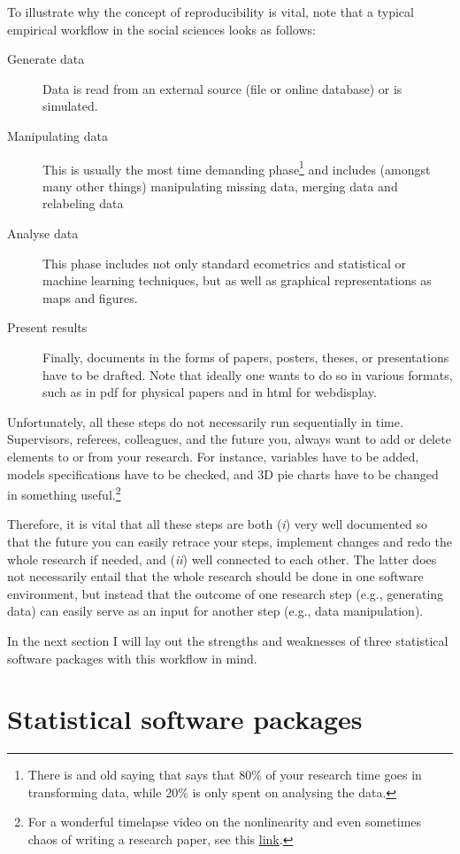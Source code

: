 \documentclass[fleqn,10pt]{SelfArx} %
\begin{document}
To illustrate why the concept of reproducibility is vital, note that a typical empirical workflow in the social sciences looks as follows:
\begin{description}
\item[Generate data] Data is read from an external source (file or online database) or is simulated.  
\item[Manipulating data] This is usually the most time demanding
  phase\footnote{There is and old saying that says that 80\% of your research time
  goes in transforming data, while 20\% is only spent on analysing the data.} and
  includes (amongst many other things) manipulating missing data, merging data
  and relabeling data
\item[Analyse data] This phase includes not only standard ecometrics and
  statistical or machine learning techniques, but as well as graphical
  representations as maps and figures. 
\item[Present results] Finally, documents in the forms of papers, posters, theses, or
  presentations have to be drafted. Note that ideally one wants to do so in various
  formats, such as in pdf for physical papers and in html for webdisplay. 
\end{description}
Unfortunately, all these steps do not necessarily run sequentially in time. Supervisors,
referees, colleagues, and the future you, always want to add or delete elements
to or from your research. For instance, variables have to be added,
models specifications have to be checked, and 3D pie charts have to be changed
in something useful.\footnote{For a wonderful timelapse video on the nonlinearity and even sometimes chaos of writing a research paper, see this \href{https://www.youtube.com/watch?v=hNENiG7LAnc}{link}.}

Therefore, it is vital that all these steps are both (\emph{i}) very well
documented so that the future you can easily retrace your steps, implement
changes and redo the whole research if needed, and (\emph{ii}) well connected to
each other. The latter does not necessarily entail that the whole research
should be done in one software environment, but instead that the outcome of one
research step (e.g., generating data) can easily serve as an input for another
step (e.g., data manipulation).

In the next section I will lay out the strengths and weaknesses of three
statistical software packages with this workflow in mind. 

\section*{Statistical software packages}
\end{document}
